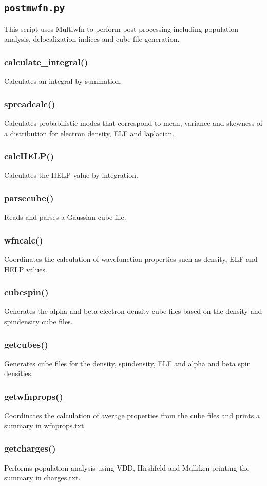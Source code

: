 \documentclass[a4paper,12pt]{assignment}
\begin{document}
\subsection{\texttt{postmwfn.py}}
This script uses Multiwfn to perform post processing including population analysis, delocalization indices and cube file generation.
\subsubsection{calculate\_integral()}
Calculates an integral by summation.
\subsubsection{spreadcalc()}
Calculates probabilistic modes that correspond to mean, variance and skewness of a distribution for electron density, ELF and laplacian.
\subsubsection{calcHELP()}
Calculates the HELP value by integration.
\subsubsection{parsecube()}
Reads and parses a Gaussian cube file.
\subsubsection{wfncalc()}
Coordinates the calculation of wavefunction properties such as density, ELF and HELP values.
\subsubsection{cubespin()}
Generates the alpha and beta electron density cube files based on the density and spindensity cube files.
\subsubsection{getcubes()}
Generates cube files for the density, spindensity, ELF and alpha and beta spin densities.
\subsubsection{getwfnprops()}
Coordinates the calculation of average properties from the cube files and prints a summary in wfnprops.txt.
\subsubsection{getcharges()}
Performs population analysis using VDD, Hirshfeld and Mulliken printing the summary in charges.txt.
\end{document}
